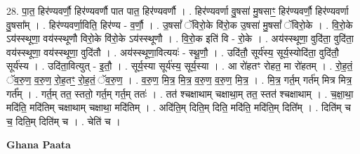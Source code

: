 \documentclass[17pt]{extarticle}
\begin{document}
28. पा॒त॒ हिर॑ण्यवर्णौ॒ हिर॑ण्यवर्णौ पात पात॒ हिर॑ण्यवर्णौ । . हिर॑ण्यवर्णा वु॒षसा॑ मु॒षसाꣳ॒॒ हिर॑ण्यवर्णौ॒ हिर॑ण्यवर्णा वु॒षसा᳚म् । . हिर॑ण्यवर्णा॒विति॒ हिर॑ण्य - व॒र्णौ॒ । . उ॒षसां᳚ ॅविरो॒के वि॑रो॒क उ॒षसा॑ मु॒षसां᳚ ॅविरो॒के । . वि॒रो॒के ऽय॑स्स्थूणा॒ वय॑स्स्थूणौ विरो॒के वि॑रो॒के ऽय॑स्स्थूणौ । . वि॒रो॒क इति॑ वि - रो॒के । . अय॑स्स्थूणा॒ वुदि॑ता॒ वुदि॑ता॒ वय॑स्स्थूणा॒ वय॑स्स्थूणा॒ वुदि॑तौ । . अय॑स्स्थूणा॒वित्ययः॑ - स्थू॒णौ॒ । . उदि॑तौ॒ सूर्य॑स्य॒ सूर्य॒स्योदि॑ता॒ वुदि॑तौ॒ सूर्य॑स्य । . उदि॑ता॒वित्युत् - इ॒तौ॒ । . सूर्य॒स्या सूर्य॑स्य॒ सूर्य॒स्या । . आ रो॑हतꣳ रोहत॒ मा रो॑हतम् । . रो॒ह॒तं॒ ॅव॒रु॒ण॒ व॒रु॒ण॒ रो॒ह॒तꣳ॒॒ रो॒ह॒तं॒ ॅव॒रु॒ण॒ । . व॒रु॒ण॒ मि॒त्र॒ मि॒त्र॒ व॒रु॒ण॒ व॒रु॒ण॒ मि॒त्र॒ । . मि॒त्र॒ गर्त॒म् गर्त॑म् मित्र मित्र॒ गर्त᳚म् । . गर्त॒म् तत॒ स्ततो॒ गर्त॒म् गर्त॒म् ततः॑ । . तत॑ श्चक्षाथाम् चक्षाथा॒म् तत॒ स्तत॑ श्चक्षाथाम् । . च॒क्षा॒था॒ मदि॑ति॒ मदि॑तिम् चक्षाथाम् चक्षाथा॒ मदि॑तिम् । . अदि॑ति॒म् दिति॒म् दिति॒ मदि॑ति॒ मदि॑ति॒म् दिति᳚म् । . दिति॑म् च च॒ दिति॒म् दिति॑म् च । . चेति॑ च । \newline

\textbf{Ghana Paata } \newline
\end{document}
